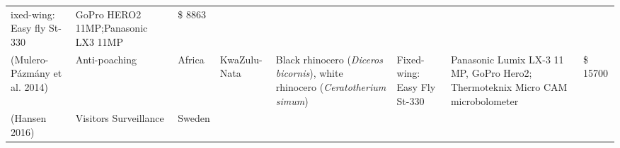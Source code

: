 \documentclass[]{interact}
\theoremstyle{plain}%
\theoremstyle{definition}
\theoremstyle{remark}
\begin{document}
\begin{longtable}[]{@{}llllllll@{}}
\begin{minipage}[t]{0.09\columnwidth}
ixed-wing: Easy fly St-330\strut
\end{minipage} & \begin{minipage}[t]{0.11\columnwidth}\raggedright\strut
GoPro HERO2 11MP;Panasonic LX3 11MP\strut
\end{minipage} & \begin{minipage}[t]{0.01\columnwidth}\raggedright\strut
\$ 8863\strut
\end{minipage}\tabularnewline
\begin{minipage}[t]{0.11\columnwidth}\raggedright\strut
(Mulero-Pázmány et al. 2014)\strut
\end{minipage} & \begin{minipage}[t]{0.18\columnwidth}\raggedright\strut
Anti-poaching\strut
\end{minipage} & \begin{minipage}[t]{0.03\columnwidth}\raggedright\strut
Africa\strut
\end{minipage} & \begin{minipage}[t]{0.14\columnwidth}\raggedright\strut
KwaZulu-Nata\strut
\end{minipage} & \begin{minipage}[t]{0.10\columnwidth}\raggedright\strut
Black rhinocero (\emph{Diceros bicornis}), white rhinocero
(\emph{Ceratotherium simum})\strut
\end{minipage} & \begin{minipage}[t]{0.09\columnwidth}\raggedright\strut
Fixed-wing: Easy Fly St-330\strut
\end{minipage} & \begin{minipage}[t]{0.11\columnwidth}\raggedright\strut
Panasonic Lumix LX-3 11 MP, GoPro Hero2; Thermoteknix Micro CAM
microbolometer\strut
\end{minipage} & \begin{minipage}[t]{0.01\columnwidth}\raggedright\strut
\$ 15700\strut
\end{minipage}\tabularnewline
\begin{minipage}[t]{0.11\columnwidth}\raggedright\strut
(Hansen 2016)\strut
\end{minipage} & \begin{minipage}[t]{0.18\columnwidth}\raggedright\strut
Visitors Surveillance\strut
\end{minipage} & \begin{minipage}[t]{0.03\columnwidth}\raggedright\strut
Sweden\strut
\end{minipage} & \begin{minipage}[t]{0.14\columnwidth}\raggedright\strut

\end{minipage}
\end{longtable}
\end{document}
